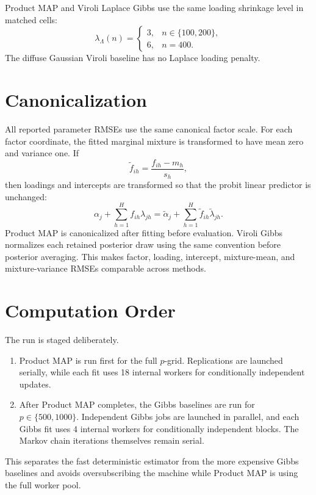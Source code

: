 \documentclass[11pt]{article}
\begin{document}
Product MAP and Viroli Laplace Gibbs use the same loading shrinkage level in
matched cells:
\[
\lambda_{\Lambda}(n) =
\begin{cases}
3, & n \in \{100,200\},\\
6, & n = 400.
\end{cases}
\]
The diffuse Gaussian Viroli baseline has no Laplace loading penalty.

\section*{Canonicalization}

All reported parameter RMSEs use the same canonical factor scale. For each
factor coordinate, the fitted marginal mixture is transformed to have mean zero
and variance one. If
\[
\tilde f_{ih} = \frac{f_{ih} - m_h}{s_h},
\]
then loadings and intercepts are transformed so that the probit linear
predictor is unchanged:
\[
\alpha_j + \sum_{h=1}^H f_{ih}\lambda_{jh}
=
\tilde \alpha_j + \sum_{h=1}^H \tilde f_{ih}\tilde \lambda_{jh}.
\]
Product MAP is canonicalized after fitting before evaluation. Viroli Gibbs
normalizes each retained posterior draw using the same convention before
posterior averaging. This makes factor, loading, intercept, mixture-mean, and
mixture-variance RMSEs comparable across methods.

\section*{Computation Order}

The run is staged deliberately.

\begin{enumerate}
\item Product MAP is run first for the full \(p\)-grid. Replications are
      launched serially, while each fit uses 18 internal workers for
      conditionally independent updates.
\item After Product MAP completes, the Gibbs baselines are run for
      \(p \in \{500,1000\}\). Independent Gibbs jobs are launched in parallel,
      and each Gibbs fit uses 4 internal workers for conditionally independent
      blocks. The Markov chain iterations themselves remain serial.
\end{enumerate}

This separates the fast deterministic estimator from the more expensive Gibbs
baselines and avoids oversubscribing the machine while Product MAP is using the
full worker pool.
\end{document}
